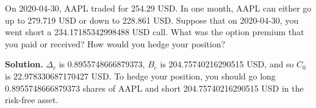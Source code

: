 \noindent On 2020-04-30, AAPL traded for 254.29 USD. In one month, AAPL can either go up to 279.719 USD or down to 228.861 USD. Suppose that on 2020-04-30, you went short a 234.17185342998488 USD call. What was the option premium that you paid or received? How would you hedge your position?

\vspace{9pt}

\noindent\textbf{Solution.} $\Delta_{c}$ is 0.8955748666879373, $B_{c}$ is 204.75740216290515 USD, and so $C_{0}$ is 22.978330687170427 USD. To hedge your position, you should go long 0.8955748666879373 shares of AAPL and short 204.75740216290515 USD in the risk-free asset.